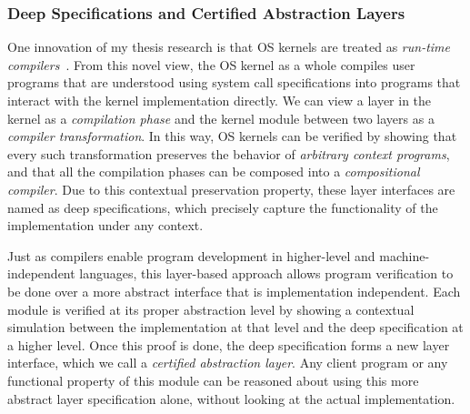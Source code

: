 \documentclass[a4paper, 10pt]{article}
\begin{document}
\begin{small}
\subsubsection*{\small Deep Specifications and Certified Abstraction Layers}
\begin{comment}
Modern OS kernels are designed and constructed using a
stack of \emph{abstraction layers},
each of which defines an interface that hides the underlying implementation
details. Client programs can be understood solely based on the interface,
independent of the layer implementation. Despite their huge contributions
to the computer industry,
abstraction layers have mostly been treated as a system
concept; before our work, they have almost never been formally specified or verified.
\end{comment}
One innovation of my thesis research is that  OS kernels are treated as \emph{run-time compilers}~\cite{popl15-gu}.
From this novel view,
the OS kernel as a whole compiles
user programs that are understood using system call specifications  into programs that interact 
with the kernel implementation directly.
We can view a layer in the kernel as a \emph{compilation phase}
and the kernel module between two layers as a \emph{compiler transformation}.
In this way,  OS kernels can be verified by showing that
every such transformation
preserves the behavior of \emph{arbitrary context programs},
and that all the compilation phases can be composed into a \emph{compositional compiler}.
Due to this contextual preservation property,
these layer interfaces are named
as deep specifications, which precisely capture the functionality of the implementation under any context.


Just as compilers enable program development
in higher-level and machine-independent languages,
this layer-based approach allows program verification to be done
over a more abstract interface that is implementation independent. Each module is verified
at its proper abstraction level by showing a contextual
simulation between the implementation at that level
and the deep specification at a higher level.
Once this proof is done, the deep specification forms a new layer interface, which we call a \emph{certified abstraction layer}.
Any client program or any functional property of this module
can be reasoned about using this more abstract  layer specification alone, without looking at the actual implementation.


\end{small}
\end{document}
